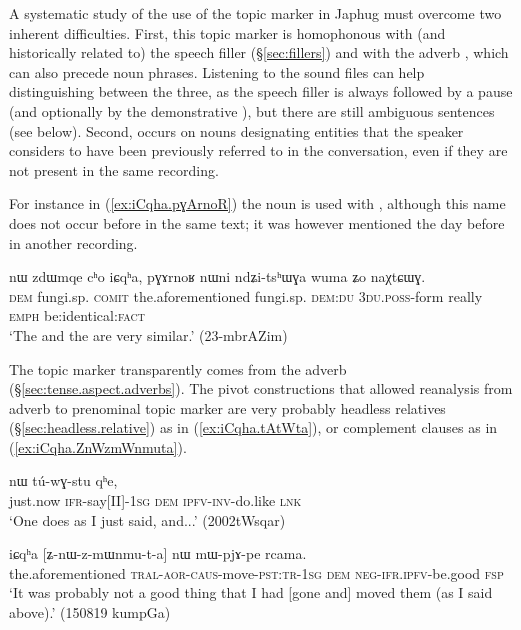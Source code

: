 A systematic study of the use of the topic marker  in Japhug must overcome two inherent difficulties. First, this topic marker is homophonous with (and historically related to) the speech filler  (§\ref{sec:fillers}) and with the adverb , which can also precede noun phrases. Listening to the sound files can help distinguishing between the three, as the speech filler is always followed by a pause (and optionally by the demonstrative ), but there are still ambiguous sentences (see below). Second,  occurs on nouns designating entities that the speaker considers to have been previously referred to in the conversation, even if they are not present in the same recording. 

For instance in (\ref{ex:iCqha.pɣArnoR}) the noun  is used with , although this name does not occur before in the same text; it was however mentioned the day before in another recording.

\begin{exe}
\ex \label{ex:iCqha.pɣArnoR}
\gll nɯ zdɯmqe cʰo iɕqʰa, pɣɤrnoʁ nɯni ndʑi-tsʰɯɣa wuma ʑo naχtɕɯɣ. \\
\textsc{dem} fungi.sp. \textsc{comit} the.aforementioned fungi.sp. \textsc{dem}:\textsc{du} \textsc{3du}.\textsc{poss}-form really \textsc{emph} be:identical:\textsc{fact} \\
\glt `The  and the  are very similar.' (23-mbrAZim)
\end{exe}

 
The topic marker  transparently comes from the adverb  (§\ref{sec:tense.aspect.adverbs}). The pivot constructions that allowed reanalysis from adverb to prenominal topic marker are very probably headless relatives (§\ref{sec:headless.relative}) as in  (\ref{ex:iCqha.tAtWta}), or complement clauses as in (\ref{ex:iCqha.ZnWzmWnmuta}). 

\begin{exe}
\ex \label{ex:iCqha.tAtWta}
  nɯ tú-wɣ-stu qʰe, \\
 just.now \textsc{ifr}-say[II]-\textsc{1sg} \textsc{dem} \textsc{ipfv}-\textsc{inv}-do.like \textsc{lnk} \\
\glt `One does as I just said, and...' (2002tWsqar)
\end{exe}

\begin{exe}
\ex \label{ex:iCqha.ZnWzmWnmuta}
 \gll iɕqʰa [ʑ-nɯ-z-mɯnmu-t-a] nɯ mɯ-pjɤ-pe rcama.  \\
the.aforementioned  \textsc{tral}-\textsc{aor}-\textsc{caus}-move-\textsc{pst}:\textsc{tr}-\textsc{1sg} \textsc{dem} \textsc{neg}-\textsc{ifr}.\textsc{ipfv}-be.good \textsc{fsp} \\
\glt `It was probably not a good thing that I had [gone and] moved them (as I said above).' (150819 kumpGa) 
 \end{exe}
 
